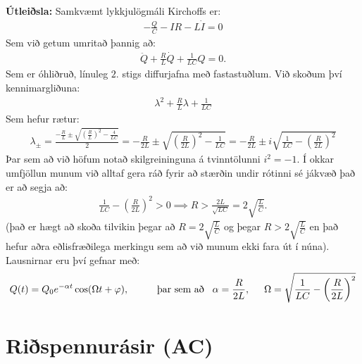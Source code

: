\textbf{Útleiðsla:} Samkvæmt lykkjulögmáli Kirchoffs er:
\begin{align*}
    -\frac{Q}{C} - IR - L\dot{I} = 0
\end{align*}
Sem við getum umritað þannig að:
\begin{align*}
    \ddot{Q} + \frac{R}{L}\dot{Q} + \frac{1}{LC}Q = 0.
\end{align*}
Sem er óhliðruð, línuleg $2.$ stigs diffurjafna með fastastuðlum. Við skoðum því kennimargliðuna:
\begin{align*}
    \lambda^2 + \frac{R}{L}\lambda + \frac{1}{LC}
\end{align*}
Sem hefur rætur:
\begin{align*}
    \lambda_\pm = \frac{-\frac{R}{L} \pm \sqrt{\left( \frac{R}{L} \right)^2 - \frac{4}{LC}}}{2} = -\frac{R}{2L} \pm \sqrt{\left( \frac{R}{2L} \right)^2 - \frac{1}{LC}} = -\frac{R}{2L} \pm i \sqrt{\frac{1}{LC} - \left(\frac{R}{2L}\right)^2}
\end{align*}
Þar sem að við höfum notað skilgreininguna á tvinntölunni $i^2 = -1$. Í okkar umfjöllun munum við alltaf gera ráð fyrir að stærðin undir rótinni sé jákvæð það er að segja að:
\begin{align*}
    \frac{1}{LC} - \left(\frac{R}{2L}\right)^2 > 0 \implies R >  \frac{2L}{\sqrt{LC}} = 2\sqrt{\frac{L}{C}}.
\end{align*}
(það er hægt að skoða tilvikin þegar að $R = 2\sqrt{\frac{L}{C}}$ og þegar $R > 2\sqrt{\frac{L}{C}}$ en það hefur aðra eðlisfræðilega merkingu sem að við munum ekki fara út í núna). Lausnirnar eru því gefnar með:
\begin{align*}
    Q(t) = Q_0 e^{-\alpha t} \cos( \Omega t + \varphi), \hspace{1cm} \text{þar sem að} \hspace{0.3cm} \alpha = \frac{R}{2L}, \hspace{0.5cm} \Omega = \sqrt{\frac{1}{LC} - \left( \frac{R}{2L} \right)^2}
\end{align*}


\section{Riðspennurásir (AC)}


